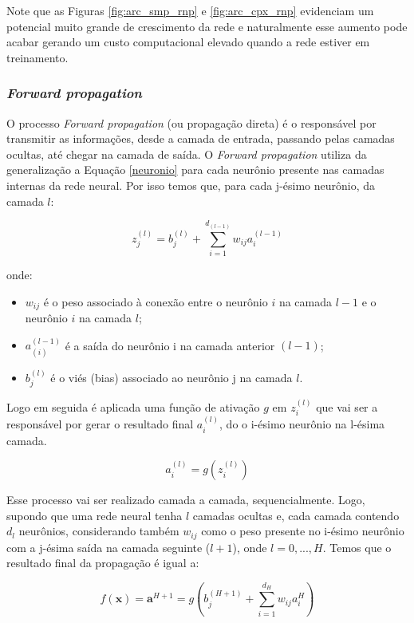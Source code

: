 Note que as Figuras \ref{fig:arc_smp_rnp} e \ref{fig:arc_cpx_rnp} evidenciam um potencial muito grande de crescimento da rede e naturalmente esse aumento pode acabar gerando um custo computacional elevado quando a rede estiver em treinamento.

\vspace{1cm}

\subsubsection{\textit{Forward propagation}}

O processo \textit{Forward propagation} (ou propagação direta) é o responsável por transmitir as informações, desde a camada de entrada, passando pelas camadas ocultas, até chegar na camada de saída. O \textit{Forward propagation} utiliza da generalização a Equação \ref{neuronio} para cada neurônio presente nas camadas internas da rede neural. Por isso temos que, para cada j-ésimo neurônio, da camada $l$:

\[
z_{j}^{(l)} = b_{j}^{(l)} + \sum_{i=1}^{d_{(l-1)}} w_{ij}a_{i}^{(l-1)} 
\]

\hspace{-1cm}onde:
\begin{itemize}
    \item $w_{ij}$ é o peso associado à conexão entre o neurônio $i$ na camada $l-1$ e o neurônio $i$ na camada $l$;
    \item $a_{(i)}^{(l-1)}$ é a saída do neurônio i na camada anterior $(l-1)$;
    \item $b_{j}^{(l)}$ é o viés (bias) associado ao neurônio j na camada $l$.
\end{itemize}

Logo em seguida é aplicada uma função de ativação $g$ em $z_{i}^{(l)}$ que vai ser a responsável por gerar o resultado final $a_{i}^{(l)}$, do o i-ésimo neurônio na l-ésima camada.

\[a_{i}^{(l)} = g(z_{i}^{(l)})\]

Esse processo vai ser realizado camada a camada, sequencialmente. Logo, supondo que uma rede neural tenha $l$ camadas ocultas e, cada camada contendo $d_l$ neurônios, considerando também $w_{ij}$ como o peso presente no i-ésimo neurônio com a j-ésima saída na camada seguinte ($l+1$), onde $l=0,...,H$. Temos que o resultado final da propagação é igual a:

\begin{equation}
    f(\textbf{x}) = \textbf{a}^{H+1} = g(b_{j}^{(H+1)} + \sum_{i=1}^{d_{H}} w_{ij}a_{i}^{H}) 
\end{equation}


